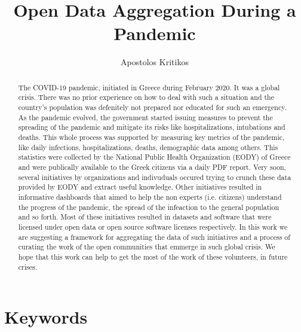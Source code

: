 \documentclass[10pt,a4paper]{article}
\begin{document}
\pagestyle{fancy}

\title{Open Data Aggregation During a Pandemic}
\author[1]{Apostolos Kritikos}

\maketitle
\thispagestyle{fancy}

\begin{abstract}

The COVID-19 pandemic, initiated in Greece during February 2020. It was a global crisis. There was no prior experience on how to deal with such a situation and the country's population was defenitely not prepared nor educated for such an emergency. As the pandemic evolved, the government started issuing measures to prevent the spreading of the pandemic and mitigate its risks like hospitalizations, intubations and deaths. This whole process was supported by measuring key metrics of the pandemic, like daily infections, hospitalizations, deaths, demographic data among others. This statistics were collected by the National Public Health Organization (EODY) of Greece and were publically available to the Greek citizens via a daily PDF report. Very soon, several initiatives by organizations and indivuduals occured trying to crunch these data provided by EODY and extract useful knowledge. Other initiatives resulted in informative dashboards that aimed to help the non experts (i.e. citizens) understand the progress of the pandemic, the spread of the infeaction to the general population and so forth. Most of these initiatives resulted in datasets and software that were licensed under open data or open source software licenses respectively. In this work we are suggesting a framework for aggregating the data of such initiatives and a process of curating the work of the open communities that emmerge in such global crisis. We hope that this work can help to get the most of the work of these volunteers, in future crises. 
  
\end{abstract}

\section*{\color{OREblue}Keywords}
\end{document}
